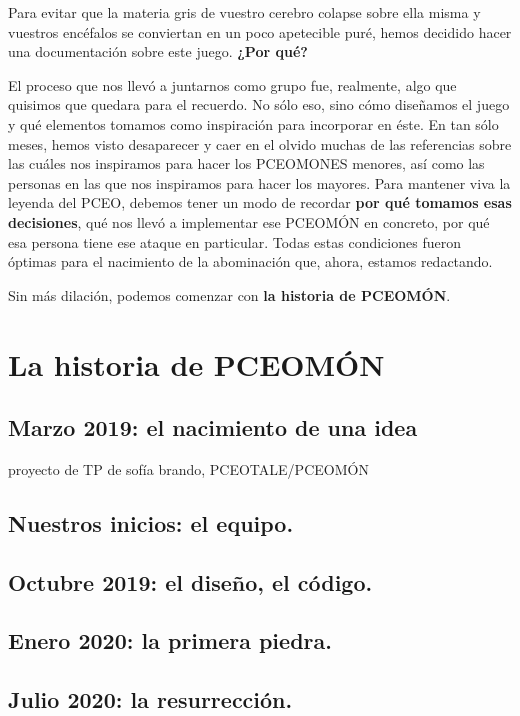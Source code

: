 \documentclass[letterpaper]{article}
\begin{document}
Para evitar que la materia gris de vuestro cerebro colapse sobre ella misma y vuestros encéfalos se conviertan en un poco apetecible puré, hemos decidido hacer una documentación sobre este juego. \textbf{¿Por qué?}

El proceso que nos llevó a juntarnos como grupo fue, realmente, algo que quisimos que quedara para el recuerdo. No sólo eso, sino cómo diseñamos el juego y qué elementos tomamos como inspiración para incorporar en éste. En tan sólo meses, hemos visto desaparecer y caer en el olvido muchas de las referencias sobre las cuáles nos inspiramos para hacer los PCEOMONES menores, así como las personas en las que nos inspiramos para hacer los mayores. Para mantener viva la leyenda del PCEO, debemos tener un modo de recordar \textbf{por qué tomamos esas decisiones}, qué nos llevó a implementar ese PCEOMÓN en concreto, por qué esa persona tiene ese ataque en particular. Todas estas condiciones fueron óptimas para el nacimiento de la abominación que, ahora, estamos redactando.

Sin más dilación, podemos comenzar con \textbf{la historia de PCEOMÓN}.

\section{La historia de PCEOMÓN}

\subsection{Marzo 2019: el nacimiento de una idea}

proyecto de TP de sofía brando, PCEOTALE/PCEOMÓN

\subsection{Nuestros inicios: el equipo.}

\subsection{Octubre 2019: el diseño, el código.}

\subsection{Enero 2020: la primera piedra.}

\subsection{Julio 2020: la resurrección.}
\end{document}
